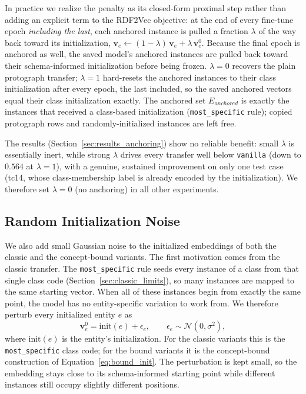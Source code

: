 \documentclass[a4paper,oneside,bibliography=totoc]{scrbook}
\begin{document}
In practice we realize the penalty as its closed-form proximal step rather than
adding an explicit term to the RDF2Vec objective: at the end of every fine-tune
epoch \emph{including the last}, each anchored instance is pulled a fraction
\(\lambda\) of the way back toward its initialization,
\(\mathbf{v}_e \leftarrow (1-\lambda)\,\mathbf{v}_e + \lambda\,\mathbf{v}^0_e\).
Because the final epoch is anchored as well, the saved model's anchored instances
are pulled back toward their schema-informed initialization before being frozen.
\(\lambda=0\) recovers the plain protograph transfer; \(\lambda=1\) hard-resets
the anchored instances to their class initialization after every epoch, the last
included, so the saved anchored vectors equal their class initialization exactly.
The anchored set \(E_{anchored}\) is exactly the instances that
received a class-based initialization (\texttt{most\_specific} rule); copied
protograph rows and randomly-initialized instances are left free.

The results (Section~\ref{sec:results_anchoring}) show no reliable benefit:
small \(\lambda\) is essentially inert, while strong \(\lambda\) drives every
transfer well below \texttt{vanilla} (down to \(0.564\) at \(\lambda=1\)), with a
genuine, sustained improvement on only one test case (tc14, whose
class-membership label is already encoded by the initialization). We therefore
set \(\lambda=0\) (no anchoring) in all other experiments.

\subsection{Random Initialization Noise}
\label{sec:classic_noise}
\label{sec:jitter}

We also add small Gaussian noise to the initialized embeddings of both the
classic and the concept-bound variants. The first motivation comes from the
classic transfer. The \texttt{most\_specific} rule seeds every instance of a
class from that single class code (Section~\ref{sec:classic_limits}), so many
instances are mapped to the same starting vector. When all of these instances
begin from exactly the same point, the model has no entity-specific variation to
work from. We therefore perturb every initialized entity \(e\) as
\[
\mathbf{v}_e^{0}
=
\mathrm{init}(e)
+
\epsilon_e,
\qquad
\epsilon_e \sim \mathcal{N}(0, \sigma^2),
\]
where \(\mathrm{init}(e)\) is the entity's initialization. For the classic
variants this is the \texttt{most\_specific} class code; for the bound variants
it is the concept-bound construction of Equation~\eqref{eq:bound_init}. The
perturbation is kept small, so the embedding stays close to its schema-informed
starting point while different instances still occupy slightly different
positions.
\end{document}
